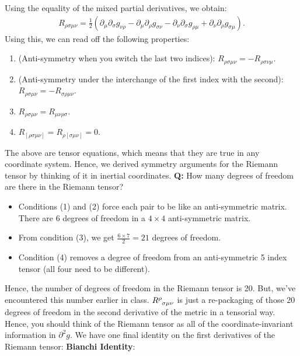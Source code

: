 \documentclass[11pt]{article}
\newcommand{\riemanntensor}[0]{\tensor{R}{^\rho_{\sigma \mu \nu}}}
\theoremstyle{definition}
\begin{document}
Using the equality of the mixed partial derivatives, we obtain: 
\begin{align*}
	R_{\rho \sigma \mu \nu} = \frac{1}{2} ( \partial_\mu \partial_\sigma g_{\nu \rho} - \partial_\mu \partial_\rho g_{\sigma \nu} - \partial_\nu \partial_\sigma g_{\rho \mu} + \partial_\nu \partial_\rho g_{\sigma \mu} ). 
\end{align*}
Using this, we can read off the following properties: 
\begin{enumerate}[noitemsep]
	\item (Anti-symmetry when you switch the last two indices): \( R_{\rho \sigma \mu \nu} = - R_{\rho \sigma \nu \mu} \). 
	\item (Anti-symmetry under the interchange of the first index with the second):\( R_{\rho \sigma \mu \nu} = - R_{\sigma \rho \mu \nu} \). 
	\item \( R_{\rho \sigma \mu \nu} = R_{\mu \nu \rho \sigma} \).
	\item \( R_{[\rho \sigma \mu \nu]} = R_{\rho[\sigma\mu \nu] } = 0 \).
\end{enumerate}
The above are tensor equations, which means that they are true in any coordinate system. Hence, we derived symmetry arguments for the Riemann tensor by thinking of it in inertial coordinates. 
\newline
\newline
\textbf{Q:} How many degrees of freedom are there in the Riemann tensor?
\begin{itemize}[noitemsep]
	\item Conditions (1) and (2) force each pair to be like an anti-symmetric matrix. There are 6 degrees of freedom in a \( 4 \times 4 \) anti-symmetric matrix. 
	\item From condition (3), we get \( \frac{6 \times 7}{2} = 21 \) degrees of freedom.
	\item Condition (4) removes a degree of freedom from an anti-symmetric 5 index tensor (all four need to be different). 
\end{itemize}
Hence, the number of degrees of freedom in the Riemann tensor is 20. But, we've encountered this number earlier in class. \( \riemanntensor \) is just a re-packaging of those 20 degrees of freedom in the second derivative of the metric in a tensorial way. Hence, you should think of the Riemann tensor as all of the coordinate-invariant information in \( \partial^2 g \). 
\newline
\newline
We have one final identity on the first derivatives of the Riemann tensor: \textbf{Bianchi Identity}: 
\end{document}
